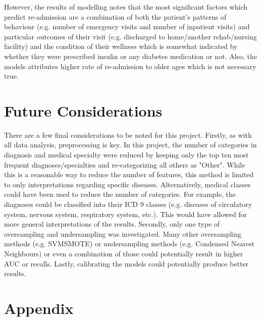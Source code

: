 \documentclass[letterpaper, 10 pt, conference]{ieeeconf}  %
\begin{document}
However, the results of modelling notes that the most significant factors which predict re-admission are a combination of both the patient's patterns of behaviour (e.g. number of emergency visits and number of inpatient visits) and particular outcomes of their visit (e.g. discharged to home/another rehab/nursing facility) and the condition of their wellness which is somewhat indicated by whether they were prescribed insulin or any diabetes medication or not. Also, the models attributes higher rate of re-admission to older ages which is not necessary true.

\section{Future Considerations}

There are a few final considerations to be noted for this project. Firstly, as with all data analysis, preprocessing is key. In this project, the number of categories in diagnosis and medical specialty were reduced by keeping only the top ten most frequent diagnoses/specialties and re-categorizing all others as "Other". While this is a reasonable way to reduce the number of features, this method is limited to only interpretations regarding specific diseases. Alternatively,  medical classes could have been used to reduce the number of categories. For example, the diagnoses could be classified into their ICD 9 classes (e.g. diseases of circulatory system, nervous system, respiratory system, etc.). This would have allowed for more general interpretations of the results. Secondly, only one type of oversampling and undersampling was investigated. Many other oversampling methods (e.g. SVMSMOTE) or undersampling methods (e.g. Condensed Nearest Neighbours) or even a combination of those could potentially result in higher AUC or recalls. Lastly, calibrating the models could potentially produce better results.




\newpage
\section{Appendix}
\end{document}
